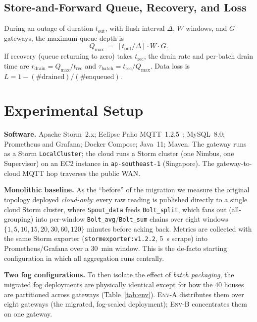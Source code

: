 \documentclass[conference]{IEEEtran}
\newcommand{\code}[1]{\texttt{#1}}
\begin{document}
\subsection{Store-and-Forward Queue, Recovery, and Loss}
During an outage of duration $t_{\text{out}}$, with flush interval $\Delta$, $W$
windows, and $G$ gateways, the maximum queue depth is
\begin{equation}
Q_{\max} \;=\; \left\lceil t_{\text{out}}/\Delta \right\rceil \cdot W \cdot G.
\label{eq:qmax}
\end{equation}
If recovery (queue returning to zero) takes $t_{\text{rec}}$, the drain rate and
per-batch drain time are
$r_{\text{drain}} = Q_{\max}/t_{\text{rec}}$ and
$\tau_{\text{batch}} = t_{\text{rec}}/Q_{\max}$.
Data loss is $L = 1 - (\#\text{drained})/(\#\text{enqueued})$.

\section{Experimental Setup}\label{sec:setup}
\textbf{Software.} Apache Storm~2.x; Eclipse Paho MQTT~1.2.5~\cite{eclipsepaho};
MySQL~8.0; Prometheus and Grafana; Docker Compose; Java~11; Maven. The gateway
runs as a Storm \code{LocalCluster}; the cloud runs a Storm cluster (one Nimbus,
one Supervisor) on an EC2 instance in \code{ap-southeast-1} (Singapore). The
gateway-to-cloud MQTT hop traverses the public WAN.

\textbf{Monolithic baseline.} As the ``before'' of the migration we measure the
original topology deployed \emph{cloud-only}: every raw reading is published
directly to a single cloud Storm cluster, where \code{Spout\_data} feeds
\code{Bolt\_split}, which fans out (all-grouping) into per-window
\code{Bolt\_avg}/\code{Bolt\_sum} chains over eight windows
$\{1,5,10,15,20,30,60,120\}$ minutes before acking back. Metrics are collected
with the same Storm exporter (\code{stormexporter:v1.2.2}, \SI{5}{\second} scrape)
into Prometheus/Grafana over a \SI{30}{\minute} window. This is the de-facto
starting configuration in which all aggregation runs centrally.

\textbf{Two fog configurations.} To then isolate the effect of \emph{batch
packaging}, the migrated fog deployments are physically identical except for how
the 40 houses are partitioned across gateways (Table~\ref{tab:env}).
\textsc{Env-A} distributes them over eight gateways (the migrated, fog-scaled
deployment); \textsc{Env-B} concentrates them on one gateway.
\end{document}
